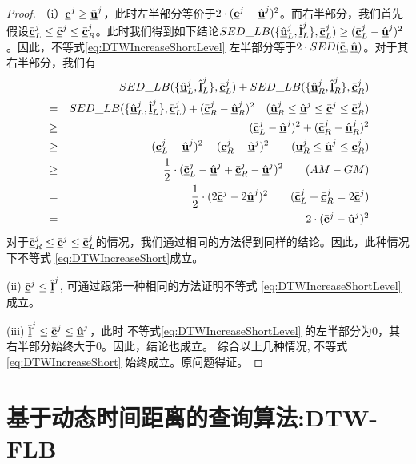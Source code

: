 \begin{proof}
	（i）$\bar{\emph{{\textbf{c}}}}^{j} \ge \hat{\emph{{\textbf{u}}}}^{j}$，此时左半部分等价于$2 \cdot (\bar{\emph{{\textbf{c}}}}^{j} - \hat{\emph{{\textbf{u}}}}^{j})^2$。而右半部分，我们首先假设$\bar{\emph{{\textbf{c}}}}_{L}^{j} \le \bar{\emph{{\textbf{c}}}}^{j} \le \bar{\emph{{\textbf{c}}}}_{R}^{j}$。此时我们得到如下结论$SED\_LB(\{ \hat{\emph{{\textbf{u}}}}_{L}^{j}, \hat{\emph{{\textbf{l}}}}_{L}^{j} \}, \bar{\emph{{\textbf{c}}}}_{L}^{j})  \ge (\bar{\emph{{\textbf{c}}}}_{L}^{j} - \hat{\emph{{\textbf{u}}}}^{j})^2$。因此，不等式\ref{eq:DTWIncreaseShortLevel} 左半部分等于$2 \cdot SED(\bar{\emph{{\textbf{c}}}} , \hat{\emph{{\textbf{u}}}})$。对于其右半部分，我们有
	\allowdisplaybreaks
	\begin{eqnarray}
	&&SED\_LB(\{ \hat{\emph{{\textbf{u}}}}_{L}^{j}, \hat{\emph{{\textbf{l}}}}_{L}^{j} \}, \bar{\emph{{\textbf{c}}}}_{L}^{j}) + SED\_LB(\{ \hat{\emph{{\textbf{u}}}}_{R}^{j}, \hat{\emph{{\textbf{l}}}}_{R}^{j} \}, \bar{\emph{{\textbf{c}}}}_{R}^{j})  \nonumber \\
	&=&SED\_LB(\{ \hat{\emph{{\textbf{u}}}}_{L}^{j}, \hat{\emph{{\textbf{l}}}}_{L}^{j} \}, \bar{\emph{{\textbf{c}}}}_{L}^{j}) + (\bar{\emph{{\textbf{c}}}}_{R}^{j}- \hat{\emph{{\textbf{u}}}}_{R}^{j})^2 \quad ( \hat{\emph{{\textbf{u}}}}_{R}^{j} \le \hat{\emph{{\textbf{u}}}}^{j} \le  \bar{\emph{{\textbf{c}}}}^{j} \le  \bar{\emph{{\textbf{c}}}}_{R}^{j}) \nonumber \\
	&\ge&(\bar{\emph{{\textbf{c}}}}_{L}^{j} - \hat{\emph{{\textbf{u}}}}^{j})^2 +  (\bar{\emph{{\textbf{c}}}}_{R}^{j}- \hat{\emph{{\textbf{u}}}}_{R}^{j})^2 \nonumber \\
	&\ge&(\bar{\emph{{\textbf{c}}}}_{L}^{j} - \hat{\emph{{\textbf{u}}}}^{j})^2 +  (\bar{\emph{{\textbf{c}}}}_{R}^{j}- \hat{\emph{{\textbf{u}}}}^{j})^2 \qquad (\bar{\emph{{\textbf{u}}}}_{R}^{j} \le \hat{\emph{{\textbf{u}}}}^{j} \le \bar{\emph{{\textbf{c}}}}_{R}^{j}) \nonumber \\
	&\ge&\frac{1}{2}\cdot (\bar{\emph{{\textbf{c}}}}_{L}^{j} - \hat{\emph{{\textbf{u}}}}^{j}  + \bar{\emph{{\textbf{c}}}}_{R}^{j} - \hat{\emph{{\textbf{u}}}}^{j})^2 \nonumber \qquad (AM-GM) \\
	&=&\frac{1}{2}\cdot (2 \bar{\emph{{\textbf{c}}}}^{j} - 2\hat{\emph{{\textbf{u}}}}^{j})^2  \qquad (\bar{\emph{{\textbf{c}}}}_{L}^{j} + \bar{\emph{{\textbf{c}}}}_{R}^{j} = 2\bar{\emph{{\textbf{c}}}}^{j}) \nonumber  \nonumber \\
	&=& 2\cdot  (\bar{\emph{{\textbf{c}}}}^{j} - \hat{\emph{{\textbf{u}}}}^{j})^2 
	\end{eqnarray}
	\allowdisplaybreaks[4]
	对于$\bar{\emph{{\textbf{c}}}}_{R}^{j} \le \bar{\emph{{\textbf{c}}}}^{j} \le \bar{\emph{{\textbf{c}}}}_{L}^{j}$的情况，我们通过相同的方法得到同样的结论。因此，此种情况下不等式 \ref{eq:DTWIncreaseShort}成立。
	
	(ii)  $\bar{\emph{{\textbf{c}}}}^{j} \le \hat{\emph{{\textbf{l}}}}^{j}$, 可通过跟第一种相同的方法证明不等式 \ref{eq:DTWIncreaseShortLevel} 成立。
	
	(iii)  $\hat{\emph{{\textbf{l}}}}^{j} \le \bar{\emph{{\textbf{c}}}}^{j} \le \hat{\emph{{\textbf{u}}}}^{j}$，此时 不等式\ref{eq:DTWIncreaseShortLevel} 的左半部分为0，其右半部分始终大于0。因此，结论也成立。
	综合以上几种情况, 不等式\ref{eq:DTWIncreaseShort} 始终成立。原问题得证。
\end{proof}



\section{基于动态时间距离的查询算法:DTW-FLB}\label{sec-c5-algorithm}
